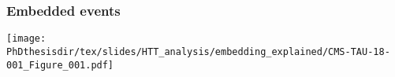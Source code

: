 \begin{frame}
\frametitle{Embedded events}
\begin{center}
\texttt{[image: \\PhDthesisdir/tex/slides/HTT\_analysis/embedding\_explained/CMS-TAU-18-001\_Figure\_001.pdf]}
\end{center}
\end{frame}